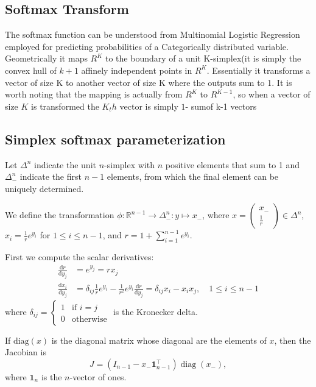 \documentclass[11pt]{article}
\begin{document}
\subsection{Softmax Transform}

The softmax function can be understood from Multinomial Logistic
Regression employed for predicting probabilities of a Categorically
distributed variable. Geometrically it maps $R^K$ to the boundary of a
unit K-simplex(it is simply the convex hull of $k+1$ affinely
independent points in $R^K$. Essentially it transforms a vector of
size K to another vector of size K where the outputs sum to 1. It is
worth noting that the mapping is actually from $R^K$ to $R^{K-1}$, so
when a vector of size $K$ is transformed the $K_th$ vector is simply
$1$- sumof k-1 vectors


\subsection{Simplex softmax parameterization}

Let $\Delta^n$ indicate the unit $n$-simplex with $n$ positive
elements that sum to 1 and $\Delta^n_-$ indicate the first $n-1$
elements, from which the final element can be uniquely determined.

We define the transformation
$\phi: \mathbb{R}^{n-1} \to \Delta^n_-: y \mapsto x_-$, where
$x=\begin{pmatrix}x_- \\ \frac{1}{r}\end{pmatrix} \in \Delta^n$,
$x_i = \frac{1}{r} e^{y_i}$ for $1 \le i \le n-1$, and
$r = 1 + \sum_{i=1}^{n-1} e^{y_i}$.

First we compute the scalar derivatives:
\[
\begin{aligned}
  \frac{\mathrm{d} r}{\mathrm{d} y_j}
  &= e^{y_j} = r x_j\\
  \frac{\mathrm{d} x_i}{\mathrm{d} y_j}
  &= \delta_{ij} \frac{1}{r} e^{y_i} - \frac{1}{r^2} e^{y_i}
  \frac{\mathrm{d} r}{\mathrm{d} y_j}
  = \delta_{ij} x_i - x_i x_j, \quad 1 \le i \le n-1
\end{aligned}
\]
where
$\delta_{ij} = \begin{cases} 1 &\text{if } i = j \\ 0
  &\text{otherwise}\end{cases}$ is the Kronecker delta.

If $\mathrm{diag}(x)$ is the diagonal matrix whose diagonal are the
elements of $x$, then the Jacobian is
\[
  J = (I_{n-1} - x_- \boldsymbol{1}_{n-1}^\top) \operatorname{diag}(x_-),
\]
where $\boldsymbol{1}_n$ is the $n$-vector of ones.
\end{document}
